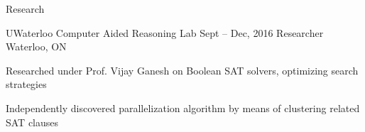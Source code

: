 \documentclass{resume} %
\begin{document}

\begin{rSection}{Research}
  \begin{rSubsection}{UWaterloo Computer Aided Reasoning Lab}
                     {Sept -- Dec, 2016}
                     {Researcher}
                     {Waterloo, ON}
    \item Researched under Prof. Vijay Ganesh on Boolean SAT solvers, optimizing
      search strategies
    \item Independently discovered parallelization algorithm by means of
      clustering related SAT clauses
  \end{rSubsection}
\end{rSection}

\end{document}
